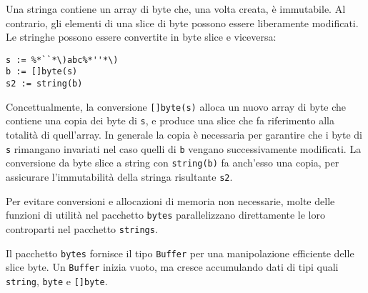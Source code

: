 Una stringa contiene un array di byte che, una volta creata, è immutabile.
Al contrario, gli elementi di una slice di byte possono essere liberamente modificati.
Le stringhe possono essere convertite in byte slice e viceversa:
\begin{lstlisting}[frame = single, label = {lst:lstlisting2-2-4.1}]
s := %*``*\)abc%*''*\)
b := []byte(s)
s2 := string(b)
\end{lstlisting}
Concettualmente, la conversione \verb|[]byte(s)| alloca un nuovo array di byte che contiene una copia dei byte di \verb|s|, e produce una slice che fa riferimento alla totalità di quell'array.
In generale la copia è necessaria per garantire che i byte di \verb|s| rimangano invariati nel caso quelli di \verb|b| vengano successivamente modificati.
La conversione da byte slice a string con \verb|string(b)| fa anch'esso una copia, per assicurare l'immutabilità della stringa risultante \verb|s2|.

Per evitare conversioni e allocazioni di memoria non necessarie, molte delle funzioni di utilità nel pacchetto \verb|bytes| parallelizzano direttamente le loro controparti nel pacchetto \verb|strings|.

Il pacchetto \verb|bytes| fornisce il tipo \verb|Buffer| per una manipolazione efficiente delle slice byte.
Un \verb|Buffer| inizia vuoto, ma cresce accumulando dati di tipi quali \verb|string|, \verb|byte| e \verb|[]byte|.